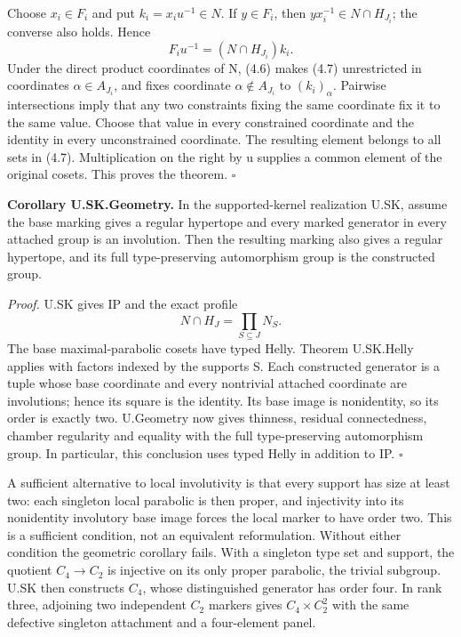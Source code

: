 \documentclass[
  11pt,
  a4paper,
]{article}
\begin{document}
Choose \(x_i\in F_i\) and put \(k_i=x_i u^{-1}\in N\). If \(y\in F_i\),
then \(yx_i^{-1}\in N\cap H_{J_i}\); the converse also holds. Hence \[
 F_i u^{-1}=(N\cap H_{J_i})k_i.
 \tag{4.7}
\] Under the direct product coordinates of N, (4.6) makes (4.7)
unrestricted in coordinates \(\alpha\in A_{J_i}\), and fixes coordinate
\(\alpha\notin A_{J_i}\) to \((k_i)_\alpha\). Pairwise intersections
imply that any two constraints fixing the same coordinate fix it to the
same value. Choose that value in every constrained coordinate and the
identity in every unconstrained coordinate. The resulting element
belongs to all sets in (4.7). Multiplication on the right by u supplies
a common element of the original cosets. This proves the theorem.
\(\square\)

\textbf{Corollary U.SK.Geometry.} In the supported-kernel realization
U.SK, assume the base marking gives a regular hypertope and every marked
generator in every attached group is an involution. Then the resulting
marking also gives a regular hypertope, and its full type-preserving
automorphism group is the constructed group.

\emph{Proof.} U.SK gives IP and the exact profile \[
 N\cap H_J=\prod_{S\subseteq J}N_S.
\] The base maximal-parabolic cosets have typed Helly. Theorem
U.SK.Helly applies with factors indexed by the supports S. Each
constructed generator is a tuple whose base coordinate and every
nontrivial attached coordinate are involutions; hence its square is the
identity. Its base image is nonidentity, so its order is exactly two.
U.Geometry now gives thinness, residual connectedness, chamber
regularity and equality with the full type-preserving automorphism
group. In particular, this conclusion uses typed Helly in addition to
IP. \(\square\)

A sufficient alternative to local involutivity is that every support has
size at least two: each singleton local parabolic is then proper, and
injectivity into its nonidentity involutory base image forces the local
marker to have order two. This is a sufficient condition, not an
equivalent reformulation. Without either condition the geometric
corollary fails. With a singleton type set and support, the quotient
\(C_4\to C_2\) is injective on its only proper parabolic, the trivial
subgroup. U.SK then constructs \(C_4\), whose distinguished generator
has order four. In rank three, adjoining two independent \(C_2\) markers
gives \(C_4\times C_2^2\) with the same defective singleton attachment
and a four-element panel.
\end{document}
